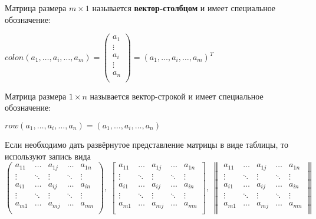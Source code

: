 \documentclass[12pt,a4paper]{article}
\begin{document}
Матрица размера $m \times 1$ называется \textbf{вектор-столбцом} и имеет специальное обозначение:\\
\par $
colon(a_1, \ldots, a_i, \ldots, a_m) = 
\left(\begin{matrix}
a_1 \\
\vdots \\
a_i \\
\vdots \\
a_n \\
\end{matrix}\right)
= (a_1, \ldots, a_i, \ldots, a_m)^T
$
\\
\par Матрица размера $1 \times n$  называется вектор-строкой и имеет специальное обозначение:
\par $
row(a_1, \ldots, a_i, \ldots, a_n) = (a_1, \ldots, a_i, \ldots, a_n)
$

\newpage 
Если необходимо дать развёрнутое представление матрицы в виде таблицы, то используют запись вида
\[
\begin{pmatrix}
a_{11} & \ldots  & a_{1j} & \ldots & a_{1n} \\
\vdots & \ddots & \vdots & \ddots & \vdots \\
a_{i1} & \ldots  & a_{ij} & \ldots & a_{in} \\
\vdots & \ddots & \vdots & \ddots & \vdots \\
a_{m1} & \ldots  & a_{mj} & \ldots & a_{mn} \\
\end{pmatrix},~
\begin{bmatrix}
a_{11} & \ldots  & a_{1j} & \ldots & a_{1n} \\
\vdots & \ddots & \vdots & \ddots & \vdots \\
a_{i1} & \ldots  & a_{ij} & \ldots & a_{in} \\
\vdots & \ddots & \vdots & \ddots & \vdots \\
a_{m1} & \ldots  & a_{mj} & \ldots & a_{mn} \\
\end{bmatrix},~
\begin{Vmatrix}
a_{11} & \ldots  & a_{1j} & \ldots & a_{1n} \\
\vdots & \ddots & \vdots & \ddots & \vdots \\
a_{i1} & \ldots  & a_{ij} & \ldots & a_{in} \\
\vdots & \ddots & \vdots & \ddots & \vdots \\
a_{m1} & \ldots  & a_{mj} & \ldots & a_{mn} \\
\end{Vmatrix}
\]
\end{document}
